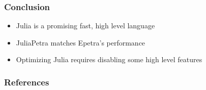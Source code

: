 \documentclass[17pt]{beamer}
\begin{document}
\begin{frame}
	\frametitle{Conclusion}
	\begin{itemize}
		\item Julia is a promising fast, high level language
		\item JuliaPetra matches Epetra's performance
		\item Optimizing Julia requires disabling some high level features
	\end{itemize}
\end{frame}
\begin{frame}[allowframebreaks]
	\frametitle{References}

	
	\small

\end{frame}
\end{document}
